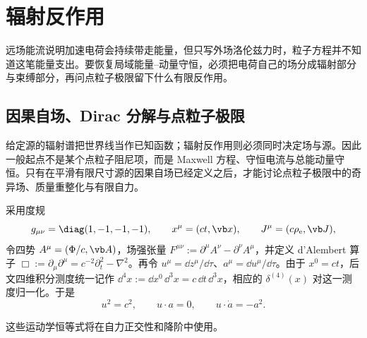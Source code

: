 \section{辐射反作用}
\label{chap:phys-rr-radiation-reaction}

远场能流说明加速电荷会持续带走能量，但只写外场洛伦兹力时，粒子方程并不知道这笔能量支出。要恢复局域能量--动量守恒，必须把电荷自己的场分成辐射部分与束缚部分，再问点粒子极限留下什么有限反作用。

\subsection{因果自场、Dirac 分解与点粒子极限}

给定源的辐射谱把世界线当作已知函数；辐射反作用则必须同时决定场与源。因此一般起点不是某个点粒子阻尼项，而是 Maxwell 方程、守恒电流与总能动量守恒。只有在平滑有限尺寸源的因果自场已经定义之后，才能讨论点粒子极限中的奇异场、质量重整化与有限自力。

\begin{definition}
采用度规
\[
 g_{\mu\nu}=\diag(1,-1,-1,-1),
 \qquad x^\mu=(ct,\vb x),
 \qquad J^\mu=(c\rho_{\rm e},\vb J),
\]
令四势 \(A^\mu=(\Phi/c,\vb A)\)，场强张量 \(F^{\mu\nu}:=\partial^\mu A^\nu-\partial^\nu A^\mu\)，并定义 d'Alembert 算子 \(\Box:=\partial_\mu\partial^\mu=c^{-2}\partial_t^2-\nabla^2\)。再令 \(u^\mu=\dd z^\mu/\dd\tau\)、\(a^\mu=\dd u^\mu/\dd\tau\)。由于 \(x^0=ct\)，后文四维积分测度统一记作 \(\dd^4x:=\dd x^0\,\dd^3x=c\,\dd t\,\dd^3x\)，相应的 \(\delta^{(4)}(x)\) 对这一测度归一化。于是
\[
 u^2=c^2,
 \qquad u\cdot a=0,
 \qquad u\cdot\dot a=-a^2.
\]
\end{definition}
这些运动学恒等式将在自力正交性和降阶中使用。

